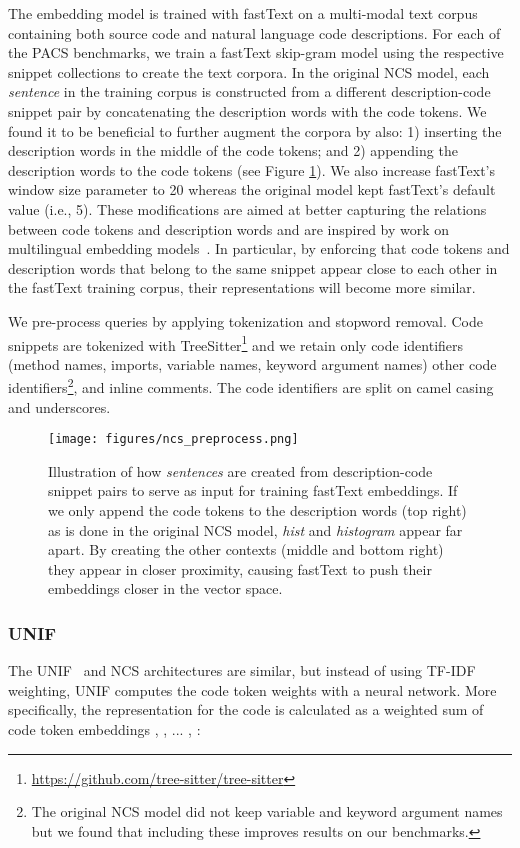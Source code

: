 \documentclass[12pt,conference, onecolumn]{IEEEtran}
\begin{document}
The embedding model  is trained with fastText  on a multi-modal text corpus containing both source code and natural language code descriptions. For each of the PACS benchmarks, we train a fastText skip-gram model using the respective snippet collections to create the text corpora. In the original NCS model, each \emph{sentence} in the training corpus is constructed from a different description-code snippet pair by concatenating the description words with the code tokens. We found it to be beneficial to further augment the corpora by also: 1) inserting the description words in the middle of the code tokens; and 2) appending the description words to the code tokens (see Figure \ref{fig:ncs_preprocessing}). We also increase fastText's window size parameter to 20 whereas the original model kept fastText's default value (i.e., 5). These modifications are aimed at better capturing the relations between code tokens and description words and are inspired by work on multilingual embedding models~\cite{Vuli2016}. In particular, by enforcing that code tokens and description words that belong to the same snippet appear close to each other in the fastText training corpus, their representations will become more similar.

We pre-process queries by applying tokenization and stopword removal. Code snippets are tokenized with TreeSitter\footnote{\url{https://github.com/tree-sitter/tree-sitter}} and we retain only code identifiers (method names, imports, variable names, keyword argument names) other code identifiers\footnote{The original NCS model did not keep variable and keyword argument names but we found that including these improves results on our benchmarks.}, and inline comments. The code identifiers are split on camel casing and underscores.

\begin{figure}
\texttt{[image: figures/ncs\_preprocess.png]}
\caption{Illustration of how \emph{sentences} are created from description-code snippet pairs to serve as input for training fastText embeddings. If we only append the code tokens to the description words (top right) as is done in the original NCS model, \emph{hist} and \emph{histogram} appear far apart. By creating the other contexts (middle and bottom right) they appear in closer proximity, causing fastText to push their embeddings closer in the vector space. }
 \label{fig:ncs_preprocessing}
\end{figure}

\subsubsection*{UNIF}
The UNIF~\cite{cambronero2019deep} and NCS architectures are similar, but instead of using TF-IDF weighting, UNIF computes the code token weights with a neural network.  More specifically, the representation for the code  is calculated as a weighted sum of code token embeddings , , ... , :
\end{document}
